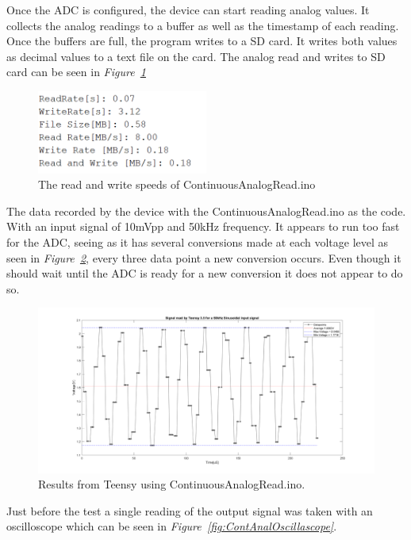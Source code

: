 Once the ADC is configured, the device can start reading analog values.
It collects the analog readings to a buffer as well as the timestamp of each reading.
Once the buffers are full, the program writes to a SD card.
It writes both values as decimal values to a text file on the card.
The analog read and writes to SD card can be seen in \textit{Figure~\ref{fig:ContAnalSpeed}}

\begin{figure}[h]
    \centering
    \includegraphics[width=0.50\textwidth]{graphics/ContinousReadSpeed.png}
    \caption{The read and write speeds of ContinuousAnalogRead.ino}
    \label{fig:ContAnalSpeed}
\end{figure}


The data recorded by the device with the ContinuousAnalogRead.ino as the code. 
With an input signal of 10mVpp and 50kHz frequency. 
It appears to run too fast for the ADC, seeing as it has several conversions made at each voltage level as seen in \textit{Figure~\ref{fig:ContAnalREsults}}, every three data point a new conversion occurs.
Even though it should wait until the ADC is ready for a new conversion it does not appear to do so.


\begin{figure}[h]
    \centering
    \includegraphics[width=1.0\textwidth]{graphics/COntANalogResults.png}
    \caption{Results from Teensy using ContinuousAnalogRead.ino.}
    \label{fig:ContAnalREsults}
\end{figure}

Just before the test a single reading of the output signal was taken with an oscilloscope which can be seen in \textit{Figure~\ref{fig:ContAnalOscillascope}}.

